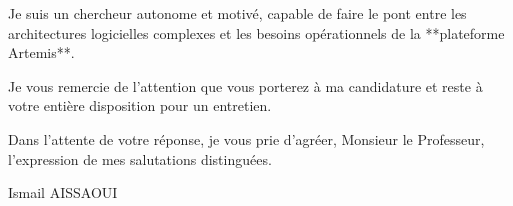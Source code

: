\documentclass[11pt,a4paper]{article}
\begin{document}
Je suis un chercheur autonome et motivé, capable de faire le pont entre les architectures logicielles complexes et les besoins opérationnels de la **plateforme Artemis**.

Je vous remercie de l'attention que vous porterez à ma candidature et reste à votre entière disposition pour un entretien.

Dans l'attente de votre réponse, je vous prie d'agréer, Monsieur le Professeur, l'expression de mes salutations distinguées.

\bigskip

\noindent Ismail AISSAOUI
\end{document}
